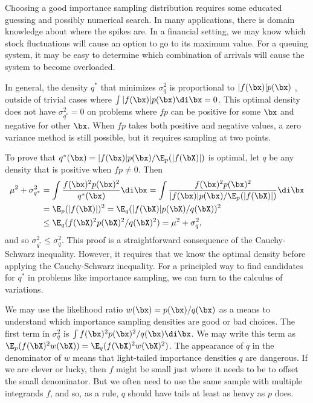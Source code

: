 Choosing a good importance sampling distribution requires some educated guessing and possibly numerical search. In many applications, there is domain knowledge about where the spikes are. In a financial setting, we may know which stock fluctuations will cause an option to go to its maximum value. For a queuing system, it may be easy to determine which combination of arrivals will cause the system to become overloaded.

In general, the density \(q^*\) that minimizes \(\sigma_q^2\) is proportional to \(|f(\bx)|p(\bx)\) \citep{kahnMethodsReducingSample1953}, outside of trivial cases where \(\int |f(\bx)|p(\bx) \di \bx = 0\). This optimal density does not have \(\sigma_{q^*}^2 = 0\) on problems where \(fp\) can be positive for some \(\bx\) and negative for other \(\bx\). When \(fp\) takes both positive and negative values, a zero variance method is still possible, but it requires sampling at two points.

To prove that \(q^*(\bx) = |f(\bx)|p(\bx)/\E_p(|f(\bX)|)\) is optimal, let \(q\) be any density that is positive when \(fp \neq 0\). Then
\begin{align*}
	\mu^2 + \sigma_{q^*}^2 & = \int \frac{f(\bx)^2p(\bx)^2}{q^*(\bx)} \di \bx = \int \frac{f(\bx)^2p(\bx)^2}{|f(\bx)|p(\bx)/\E_p(|f(\bX)|)} \di \bx \\
	                       & = \E_p(|f(\bX)|)^2 = \E_q(|f(\bX)|p(\bX)/q(\bX))^2                                                                     \\
	                       & \leq \E_q(f(\bX)^2p(\bX)^2/q(\bX)^2) = \mu^2 + \sigma_q^2,
\end{align*}
and so \(\sigma_{q^*}^2 \leq \sigma_q^2\). This proof is a straightforward consequence of the Cauchy-Schwarz inequality. However, it requires that we know the optimal density before applying the Cauchy-Schwarz inequality. For a principled way to find candidates for \(q^*\) in problems like importance sampling, we can turn to the calculus of variations.

We may use the likelihood ratio \(w(\bx) = p(\bx)/q(\bx)\) as a means to understand which importance sampling densities are good or bad choices. The first term in \(\sigma_q^2\) is \(\int f(\bx)^2p(\bx)^2/q(\bx) \di \bx\). We may write this term as \(\E_p(f(\bX)^2w(\bX)) = \E_q(f(\bX)^2w(\bX)^2)\). The appearance of \(q\) in the denominator of \(w\) means that light-tailed importance densities \(q\) are dangerous. If we are clever or lucky, then \(f\) might be small just where it needs to be to offset the small denominator. But we often need to use the same sample with multiple integrands \(f\), and so, as a rule, \(q\) should have tails at least as heavy as \(p\) does.

